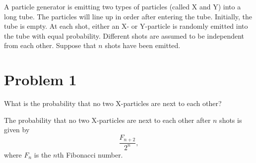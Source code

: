 A particle generator is emitting two types of particles (called X and Y) into a long tube. The particles will line up in order after entering the tube. Initially, the tube is empty. At each shot, either an X- or Y-particle is randomly emitted into the tube with equal probability. Different shots are assumed to be independent from each other. Suppose that $n$ shots have been emitted.

\section{Problem 1}

What is the probability that no two X-particles are next to each other?

\begin{theorem}
  The probability that no two X-particles are next to each other after $n$ shots is given by \[
    \frac{F_{n+2}}{2^n},
\] where $F_n$ is the $n$th Fibonacci number.
\end{theorem}
